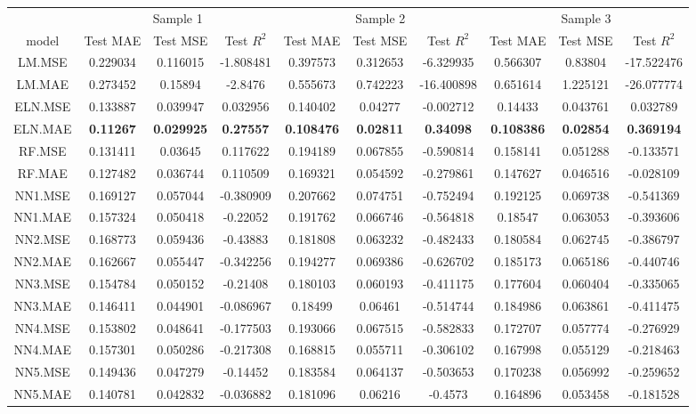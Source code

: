 \begin{table}[H]
\centering\begingroup\fontsize{6}{8}\selectfont

\begin{tabular}{cccccccccc}
\toprule
\multicolumn{1}{c}{ } & \multicolumn{3}{c}{Sample 1} & \multicolumn{3}{c}{Sample 2} & \multicolumn{3}{c}{Sample 3} \\
\cmidrule(l{3pt}r{3pt}){2-4} \cmidrule(l{3pt}r{3pt}){5-7} \cmidrule(l{3pt}r{3pt}){8-10}
model & Test MAE & Test MSE & Test $R^2$ & Test MAE & Test MSE & Test $R^2$ & Test MAE & Test MSE & Test $R^2$\\
\midrule
LM.MSE & 0.229034 & 0.116015 & -1.808481 & 0.397573 & 0.312653 & -6.329935 & 0.566307 & 0.83804 & -17.522476\\
LM.MAE & 0.273452 & 0.15894 & -2.8476 & 0.555673 & 0.742223 & -16.400898 & 0.651614 & 1.225121 & -26.077774\\
ELN.MSE & 0.133887 & 0.039947 & 0.032956 & 0.140402 & 0.04277 & -0.002712 & 0.14433 & 0.043761 & 0.032789\\
ELN.MAE & \textbf{0.11267} & \textbf{0.029925} & \textbf{0.27557} & \textbf{0.108476} & \textbf{0.02811} & \textbf{0.34098} & \textbf{0.108386} & \textbf{0.02854} & \textbf{0.369194}\\
RF.MSE & 0.131411 & 0.03645 & 0.117622 & 0.194189 & 0.067855 & -0.590814 & 0.158141 & 0.051288 & -0.133571\\
\addlinespace
RF.MAE & 0.127482 & 0.036744 & 0.110509 & 0.169321 & 0.054592 & -0.279861 & 0.147627 & 0.046516 & -0.028109\\
NN1.MSE & 0.169127 & 0.057044 & -0.380909 & 0.207662 & 0.074751 & -0.752494 & 0.192125 & 0.069738 & -0.541369\\
NN1.MAE & 0.157324 & 0.050418 & -0.22052 & 0.191762 & 0.066746 & -0.564818 & 0.18547 & 0.063053 & -0.393606\\
NN2.MSE & 0.168773 & 0.059436 & -0.43883 & 0.181808 & 0.063232 & -0.482433 & 0.180584 & 0.062745 & -0.386797\\
NN2.MAE & 0.162667 & 0.055447 & -0.342256 & 0.194277 & 0.069386 & -0.626702 & 0.185173 & 0.065186 & -0.440746\\
\addlinespace
NN3.MSE & 0.154784 & 0.050152 & -0.21408 & 0.180103 & 0.060193 & -0.411175 & 0.177604 & 0.060404 & -0.335065\\
NN3.MAE & 0.146411 & 0.044901 & -0.086967 & 0.18499 & 0.06461 & -0.514744 & 0.184986 & 0.063861 & -0.411475\\
NN4.MSE & 0.153802 & 0.048641 & -0.177503 & 0.193066 & 0.067515 & -0.582833 & 0.172707 & 0.057774 & -0.276929\\
NN4.MAE & 0.157301 & 0.050286 & -0.217308 & 0.168815 & 0.055711 & -0.306102 & 0.167998 & 0.055129 & -0.218463\\
NN5.MSE & 0.149436 & 0.047279 & -0.14452 & 0.183584 & 0.064137 & -0.503653 & 0.170238 & 0.056992 & -0.259652\\
\addlinespace
NN5.MAE & 0.140781 & 0.042832 & -0.036882 & 0.181096 & 0.06216 & -0.4573 & 0.164896 & 0.053458 & -0.181528\\
\bottomrule
\end{tabular}
\endgroup{}
\end{table}